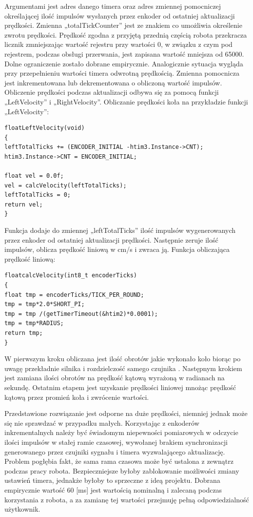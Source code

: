 \documentclass[eng,printmode]{mgr}
\begin{document}
Argumentami jest adres danego timera oraz adres zmiennej pomocniczej określającej ilość impulsów wysłanych przez enkoder od ostatniej aktualizacji prędkości. Zmienna „totalTickCounter” jest ze znakiem co umożliwia określenie zwrotu prędkości. Prędkość zgodna z przyjętą przednią częścią robota przekracza licznik zmniejszając wartość rejestru przy wartości 0, w związku z czym pod rejestrem, podczas obsługi przerwania,  jest zapisana wartość mniejsza od 65000. Dolne ograniczenie zostało dobrane empirycznie. Analogicznie sytuacja wygląda przy przepełnieniu wartości timera odwrotną prędkością. Zmienna pomocnicza jest inkrementowana lub dekrementowana o obliczoną wartość impulsów.
\\Obliczenie prędkości podczas aktualizacji odbywa się za pomocą funkcji „LeftVelocity” i „RightVelocity”. Obliczanie prędkości koła na przykładzie funkcji „LeftVelocity”:
\begin{lstlisting}[style=c]
floatLeftVelocity(void)
{
leftTotalTicks += (ENCODER_INITIAL -htim3.Instance->CNT);
htim3.Instance->CNT = ENCODER_INITIAL;

float vel = 0.0f;
vel = calcVelocity(leftTotalTicks);
leftTotalTicks = 0;
return vel;
}

\end{lstlisting}

Funkcja dodaje do zmiennej „leftTotalTicks” ilość impulsów wygenerowanych przez enkoder od ostatniej aktualizacji prędkości. Następnie zeruje ilość impulsów, oblicza prędkość liniową w cm/s i zwraca ją. Funkcja obliczająca prędkość liniową:
\begin{lstlisting}[style=c]
floatcalcVelocity(int8_t encoderTicks)
{
float tmp = encoderTicks/TICK_PER_ROUND;
tmp = tmp*2.0*SHORT_PI;
tmp = tmp /(getTimerTimeout(&htim2)*0.0001);
tmp = tmp*RADIUS;
return tmp;
}

\end{lstlisting}

W pierwszym kroku obliczana jest ilość obrotów jakie wykonało koło biorąc po uwagę przekładnie silnika i rozdzielczość samego czujnika . Następnym krokiem jest zamiana ilości obrotów na prędkość kątową wyrażoną w radianach na sekundę. Ostatnim etapem jest uzyskanie prędkości liniowej mnożąc prędkość kątową przez promień koła i zwrócenie wartości.

Przedstawione rozwiązanie jest odporne na duże prędkości,  niemniej jednak może się nie sprawdzać w przypadku małych. Korzystając z enkoderów inkrementalnych należy być świadomym niepewności pomiarowych w odczycie ilości impulsów w stałej ramie czasowej, wywołanej brakiem synchronizacji generowanego przez czujniki sygnału i timera wyzwalającego aktualizację. Problem pogłębia fakt, że sama rama czasowa może być ustalona z zewnątrz podczas pracy robota. Bezpieczniejsze byłoby zablokowanie możliwości zmiany ustawień timera, jednakże byłoby to sprzeczne z ideą projektu. Dobrana empirycznie wartość 60 [ms] jest wartością nominalną i zalecaną podczas korzystania z robota, a za zamianę tej wartości przejmuję pełną odpowiedzialność użytkownik. 
\end{document}
